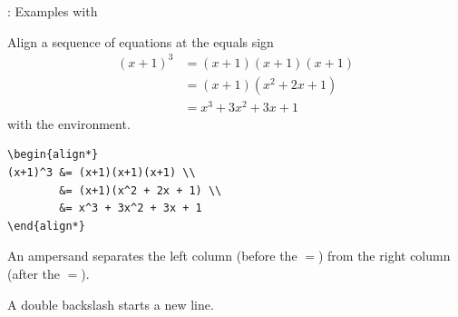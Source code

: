 \documentclass{beamer}
\begin{document}
\begin{frame}[fragile]{\insertsubsection{}: Examples with }
\begin{itemize}{\small
\item Align a sequence of equations at the equals sign
\begin{align*}
(x+1)^3 &= (x+1)(x+1)(x+1) \\
        &= (x+1)(x^2 + 2x + 1) \\
        &= x^3 + 3x^2 + 3x + 1
\end{align*}
with the  environment.

\begin{verbatim}
\begin{align*}
(x+1)^3 &= (x+1)(x+1)(x+1) \\
        &= (x+1)(x^2 + 2x + 1) \\
        &= x^3 + 3x^2 + 3x + 1
\end{align*}
\end{verbatim}
\item An ampersand \keystrokebftt{\&} separates the left column (before the
$=$) from the right column (after the $=$).
\item A double backslash \keystrokebftt{\bs}\keystrokebftt{\bs} starts a new
line.
}\end{itemize}
\end{frame}
\end{document}

